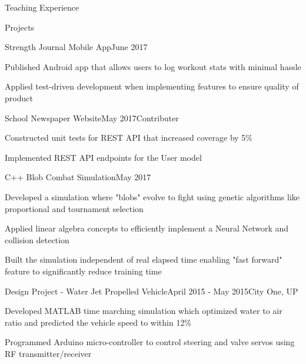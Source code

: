 \documentclass{resume} %
\begin{document}
\begin{rSection}{Teaching Experience}
\end{rSection}



\begin{rSection}{Projects}
\begin{rSubsection}{Strength Journal Mobile App}{June 2017}{}{}
\item Published Android app that allows users to log workout stats with minimal hassle
\item Applied test-driven development when implementing features to ensure quality of product
\end{rSubsection}
\begin{rSubsection}{School Newspaper Website}{May 2017}{Contributer}{}
\item Constructed unit tests for REST API that increased coverage by 5\%
\item Implemented REST API endpoints for the User model 
\end{rSubsection}
\begin{rSubsection}{C++ Blob Combat Simulation}{May 2017}{}{}
\item Developed a simulation where "blobs" evolve to fight using genetic algorithms like proportional and tournament selection
\item Applied linear algebra concepts to efficiently implement a Neural Network and collision detection
\item Built the simulation independent of real elapsed time enabling "fast forward" feature to significantly reduce training time  
\end{rSubsection}
\iffalse
\begin{rSubsection}{UUP SIAM - Direct Tap Machine Learning}{April 2017 - Present}{}{City One, UP}
\item Built a model to visualize the correlation between order quantity and seasonality, using Python pandas and matplotlib
\end{rSubsection}
\fi
\begin{rSubsection}{Design Project - Water Jet Propelled Vehicle}{April 2015 - May 2015}{}{City One, UP}
\item Developed MATLAB time marching simulation which optimized water to air ratio and predicted the vehicle speed to within 12\%
\item Programmed Arduino micro-controller to control steering and valve servos using RF transmitter/receiver
\end{rSubsection}
\iffalse
\begin{rSubsection}{JavaScript 8 Puzzle Solver}{December 2016}{}{}
\item Developed a sliding puzzle solver in pure JavaScript to animate a step by step solution
\item Is able to solve 3x3 tile board in less than 1 second using the A* algorithm
\end{rSubsection}
\fi
\end{rSection}
\end{document}
